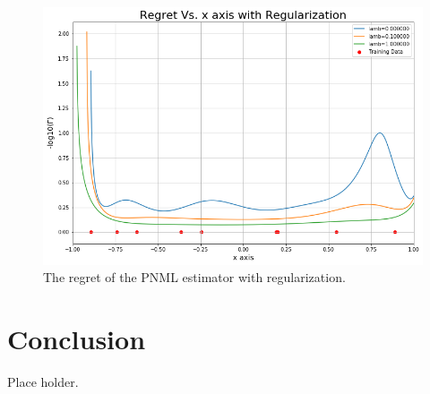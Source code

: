 \documentclass[final,1p,times]{elsarticle}
\begin{document}
\begin{figure}[h]
\centering\includegraphics[width=0.6\linewidth]{regret_with_reg_plot.png}
\caption{The regret of the PNML estimator with regularization.}
\label{fig:regret_with_reg}
\end{figure}

\section{Conclusion} \label{sec:Conclusion}
Place holder.





\end{document}
